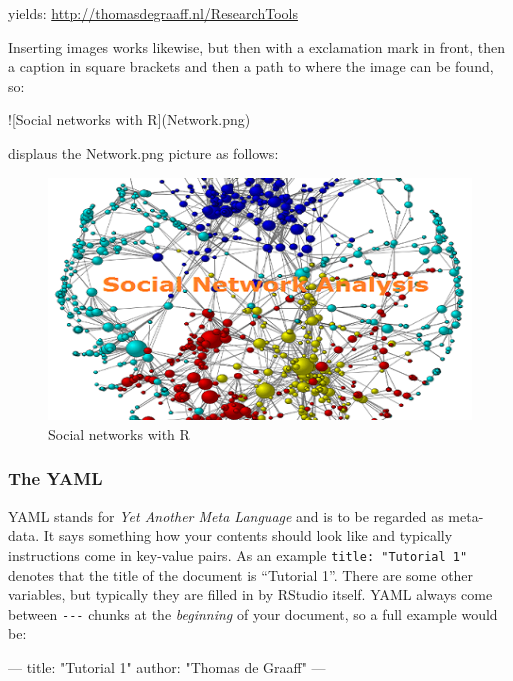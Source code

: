 \documentclass[]{article}
\newenvironment{Shaded}{\begin{snugshade}}{\end{snugshade}}
\newcommand{\AlertTok}[1]{\textcolor[rgb]{0.94,0.16,0.16}{#1}}
\newcommand{\NormalTok}[1]{#1}
\theoremstyle{definition}
\theoremstyle{definition}
\theoremstyle{definition}
\theoremstyle{remark}
\begin{document}
yields: \href{ResearchTools}{http://thomasdegraaff.nl/ResearchTools}

Inserting images works likewise, but then with a exclamation mark in
front, then a caption in square brackets and then a path to where the
image can be found, so:

\begin{Shaded}
\begin{Highlighting}[]
\AlertTok{![Social networks with R](Network.png)}
\end{Highlighting}
\end{Shaded}

displaus the Network.png picture as follows:

\begin{figure}
\centering
\includegraphics{Network.png}
\caption{Social networks with R}
\end{figure}

\subsubsection{The YAML}\label{the-yaml}

YAML stands for \emph{Yet Another Meta Language} and is to be regarded
as meta-data. It says something how your contents should look like and
typically instructions come in key-value pairs. As an example
\texttt{title:\ "Tutorial\ 1"} denotes that the title of the document is
``Tutorial 1''. There are some other variables, but typically they are
filled in by RStudio itself. YAML always come between \texttt{-\/-\/-}
chunks at the \emph{beginning} of your document, so a full example would
be:

\begin{Shaded}
\begin{Highlighting}[]
\NormalTok{---}
\NormalTok{title: "Tutorial 1"}
\NormalTok{author: "Thomas de Graaff"}
\NormalTok{---}
\end{Highlighting}
\end{Shaded}
\end{document}
